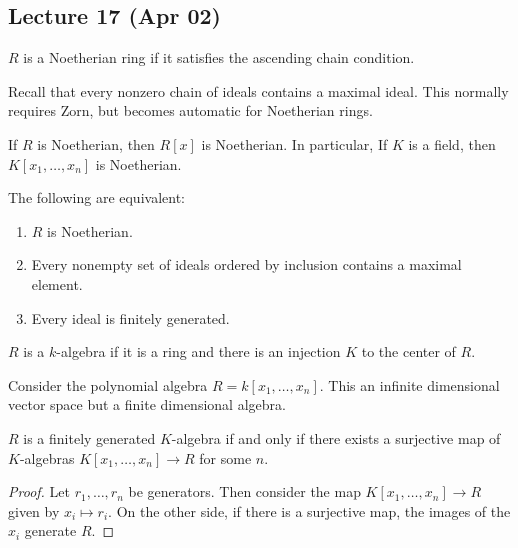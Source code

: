 \message{ !name(notes.tex)}\documentclass[10pt, twoside]{article}
\begin{document}
        \subsection{Lecture 17 (Apr 02)}

        \begin{defn}
            $R$ is a Noetherian ring if it satisfies the ascending chain condition.
        \end{defn}

        Recall that every nonzero chain of ideals contains a maximal ideal. This normally requires Zorn, but becomes automatic for Noetherian rings.

        \begin{exm}
            If $R$ is Noetherian, then $R[x]$ is Noetherian.
            In particular, If $K$ is a field, then $K[x_1, \ldots, x_n]$ is Noetherian.
        \end{exm}

        \begin{thm}
            The following are equivalent:
            \begin{enumerate}
                \item $R$ is Noetherian.
                \item Every nonempty set of ideals ordered by inclusion contains a maximal element.
                \item Every ideal is finitely generated.
            \end{enumerate}
        \end{thm}

        \begin{defn}[$k$-algebra]
            $R$ is a $k$-algebra if it is a ring and there is an injection $K$ to the center of $R$.
        \end{defn}

        \begin{exm}
            Consider the polynomial algebra $R = k[x_1, \ldots, x_n]$. This an infinite dimensional vector space but a finite dimensional algebra.
        \end{exm}

        \begin{prop}
            $R$ is a finitely generated $K$-algebra if and only if there exists a surjective map of 
            $K$-algebras $K[x_1, \ldots, x_n] \to R$ for some $n$.
            \begin{proof}
                Let $r_1, \ldots, r_n$ be generators. Then consider the map $K[x_1, \ldots, x_n] \to R$ given by $x_i \mapsto r_i$. On the other side, if there is a surjective map, the images of the $x_i$ generate $R$.
            \end{proof}
        \end{prop}
\end{document}
